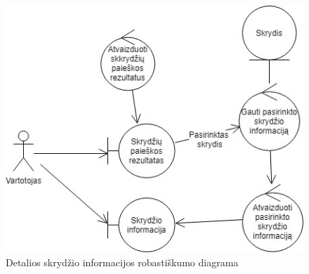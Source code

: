 \documentclass{VUMIFPSkursinis}
\begin{document}
\begin{enumerate}[label=\textbf{U\arabic*}.]
                    \begin{figure}[H]
                        \centering
                        \includegraphics[scale=0.8]{img/ROBflight-info}
                        \caption{Detalios skrydžio informacijos robastiškumo diagrama}
                        \label{home_page_one_way}
                    \end{figure}
                    
                \end{enumerate}
      
\end{document}
